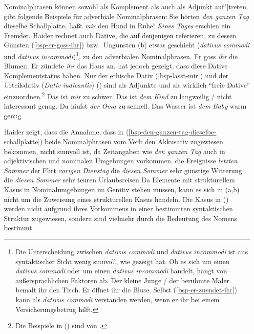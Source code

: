 Nominalphrasen können sowohl als Komplement als auch als Adjunkt
auf"|treten. \citet[80--82]{Haider85b} gibt folgende 
Beispiele für adverbiale Nominalphrasen:
\eal
\ex Sie hörten \emph{den ganzen Tag} dieselbe Schallplatte.\label{bsp-den-ganzen-tag-dieselbe-schallplatte}
\ex Laßt \emph{mir} den Hund in Ruhe!\label{bsp-lasst-mir}
\ex \emph{Eines Tages} erschien ein Fremder.
\zl
Haider rechnet auch Dative, die auf denjenigen referieren, zu dessen Gunsten (\ref{bsp-er-goss-ihr})
bzw.\ Ungunsten (b) etwas geschieht (\emph{dativus commodi} und \emph{dativus incommodi})\footnote{\label{fn-dativ-commodi}%
        Die Unterscheidung zwischen \emph{dativus commodi} und \emph{dativus incommodi}
        ist aus syntaktischer Sicht wenig sinnvoll, wie \citet*[]{Wegener85b}
        gezeigt hat.
        Ob es sich um einen \emph{dativus commodi} oder um einen \emph{dativus incommodi} handelt,
        hängt von außersprachlichen Faktoren ab.
        \eal
        \ex Der kleine Junge / der berühmte Maler bemalt ihr den Tisch.
        \ex Er öffnet ihr die Bluse.
        \zl
        Selbst (\ref{bsp-er-zuendet-ihr}) kann als \emph{dativus commodi} verstanden werden, wenn
        er ihr bei einem Versicherungsbetrug hilft.%
}, zu den adverbialen Nominalphrasen.
\eal
\ex Er goss \emph{ihr} die Blumen.\label{bsp-er-goss-ihr}
\ex Er zündete \emph{ihr} das Haus an.\label{bsp-er-zuendet-ihr}
\zl
\largerpage\enlargethispage{4pt}
\citet*{Wegener85b} hat jedoch gezeigt, dass diese Dative Komplementstatus haben.
Nur der ethische Dativ (\ref{bsp-lasst-mir}) und der Urteilsdativ (\emph{Dativ iudicantis}) ()
sind als Adjunkte und als wirklich "`freie Dative"' einzuordnen.\footnote{
        Die Beispiele in () sind von \citet*[]{Wegener85b}.
}
\eal
\ex Das ist \emph{mir} zu schwer.
\ex Das ist \emph{dem Kind} zu langweilig / nicht interessant genug.
\ex Du läufst \emph{der Oma} zu schnell.
\ex Das Wasser ist \emph{dem Baby} warm genug.
\zl

\noindent
Haider zeigt, dass die Annahme, dass in (\ref{bsp-den-ganzen-tag-dieselbe-schallplatte}) beide
Nominalphrasen vom Verb den Akkusativ zugewiesen bekommen,
nicht sinnvoll ist, da Zeitangaben wie \emph{den ganzen Tag} auch in adjektivischen und
nominalen Umgebungen vorkommen.
\eal
\ex die Ereignisse \emph{letzten Sommer}
\ex der Flirt \emph{vorigen Dienstag}
\ex die \emph{diesen Sommer} sehr günstige Witterung
\ex die \emph{diesen Sommer} sehr teuren Urlaubsreisen
\zl
Da Elemente mit strukturellem Kasus in Nominalumgebungen
im Genitiv stehen müssen, kann es sich in (a,b)
nicht um die Zuweisung eines strukturellen Kasus handeln.
%
Die Kasus in () werden nicht aufgrund ihres Vorkommens in einer bestimmten
syntaktischen Struktur zugewiesen, sondern sind vielmehr durch die Bedeutung des Nomens bestimmt.

